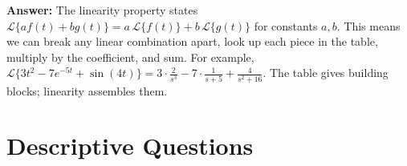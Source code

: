 \documentclass[12pt,a4paper]{article}
\begin{document}
\begin{enumerate}[leftmargin=*, label=\textbf{Q\arabic*.}]
\textbf{Answer:} The linearity property states
$\mathcal{L}\{af(t) + bg(t)\} = a\,\mathcal{L}\{f(t)\} + b\,\mathcal{L}\{g(t)\}$
for constants $a, b$. This means we can break any linear combination apart, look up
each piece in the table, multiply by the coefficient, and sum. For example,
$\mathcal{L}\{3t^2 - 7e^{-5t} + \sin(4t)\} = 3\cdot\frac{2}{s^3} - 7\cdot\frac{1}{s+5} + \frac{4}{s^2+16}$.
The table gives building blocks; linearity assembles them.

\end{enumerate}

\section{Descriptive Questions}
\end{document}
